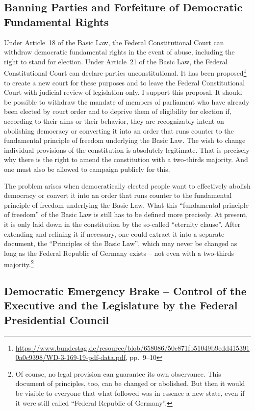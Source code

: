 \subsection{Banning Parties and Forfeiture of Democratic Fundamental Rights}
Under Article~18 of the Basic Law, the Federal Constitutional Court can withdraw democratic fundamental rights in the event of abuse, including the right to stand for election.
Under Article~21 of the Basic Law, the Federal Constitutional Court can declare parties unconstitutional.
It has been proposed\footnote{\url{https://www.bundestag.de/resource/blob/658086/50c871fb51049b9edd4153910a0c9398/WD-3-169-19-pdf-data.pdf}, pp.~9--10} to create a new court for these purposes and to leave the Federal Constitutional Court with judicial review of legislation only.
I support this proposal.
It should be possible to withdraw the mandate of members of parliament who have already been elected by court order and to deprive them of eligibility for election if, according to their aims or their behavior, they are recognizably intent on
abolishing democracy or converting it into an order that runs counter to the fundamental principle of freedom underlying the Basic Law.
The wish to change individual provisions of the constitution is absolutely legitimate.
That is precisely why there is the right to amend the constitution with a two-thirds majority.
And one must also be allowed to campaign publicly for this.

The problem arises when democratically elected people want to effectively abolish democracy or convert it into an order that runs counter to the fundamental principle of freedom underlying the Basic Law.
What this \enquote{fundamental principle of freedom} of the Basic Law is still has to be defined more precisely.
At present, it is only laid down in the constitution by the so-called \enquote{eternity clause}.
After extending and refining it if necessary, one could extract it into a separate document, the \enquote{Principles of the Basic Law}, which may never be changed as long as the Federal Republic of Germany exists -- not even with a two-thirds majority.\footnote{Of course, no legal provision can guarantee its own observance. This document of principles, too, can be changed or abolished. But then it would be visible to everyone
that what followed was in essence a new state, even if it were still called \enquote{Federal Republic of Germany}.}

\subsection{Democratic Emergency Brake -- Control of the Executive and the Legislature by the Federal Presidential Council}\label{subsec:emergency_brake}
